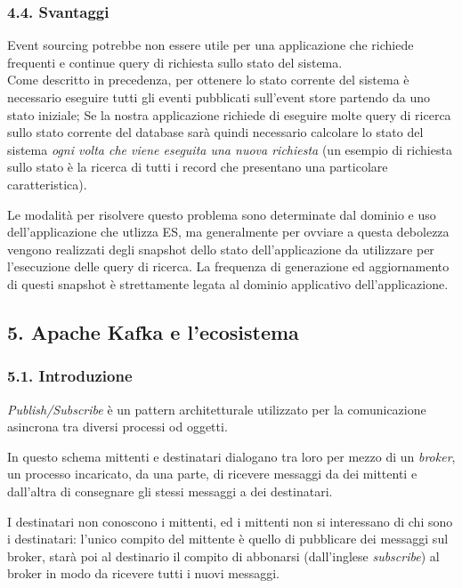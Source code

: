 \documentclass[]{article}
\begin{document}
\newpage

\subsubsection{4.4. Svantaggi}\label{svantaggi}

Event sourcing potrebbe non essere utile per una applicazione che
richiede frequenti e continue query di richiesta sullo stato del
sistema.\\
Come descritto in precedenza, per ottenere lo stato corrente del sistema
è necessario eseguire tutti gli eventi pubblicati sull'event store
partendo da uno stato iniziale; Se la nostra applicazione richiede di
eseguire molte query di ricerca sullo stato corrente del database sarà
quindi necessario calcolare lo stato del sistema \emph{ogni volta che
viene eseguita una nuova richiesta} (un esempio di richiesta sullo stato
è la ricerca di tutti i record che presentano una particolare
caratteristica).

Le modalità per risolvere questo problema sono determinate dal dominio e
uso dell'applicazione che utlizza ES, ma generalmente per ovviare a
questa debolezza vengono realizzati degli snapshot dello stato
dell'applicazione da utilizzare per l'esecuzione delle query di ricerca.
La frequenza di generazione ed aggiornamento di questi snapshot è
strettamente legata al dominio applicativo dell'applicazione.

\newpage

\subsection{5. Apache Kafka e
l'ecosistema}\label{apache-kafka-e-lecosistema}

\subsubsection{5.1. Introduzione}\label{introduzione-1}

\emph{Publish/Subscribe} è un pattern architetturale utilizzato per la
comunicazione asincrona tra diversi processi od oggetti.

In questo schema mittenti e destinatari dialogano tra loro per mezzo di
un \emph{broker}, un processo incaricato, da una parte, di ricevere
messaggi da dei mittenti e dall'altra di consegnare gli stessi messaggi
a dei destinatari.

I destinatari non conoscono i mittenti, ed i mittenti non si interessano
di chi sono i destinatari: l'unico compito del mittente è quello di
pubblicare dei messaggi sul broker, starà poi al destinario il compito
di abbonarsi (dall'inglese \emph{subscribe}) al broker in modo da
ricevere tutti i nuovi messaggi.
\end{document}
